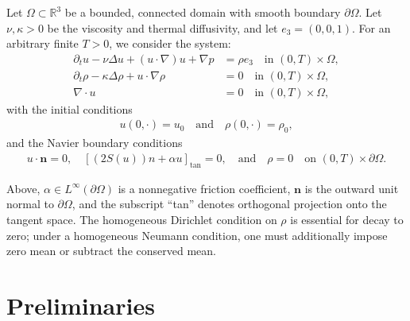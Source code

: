 \documentclass[11pt,reqno]{amsart}
\theoremstyle{plain}
\numberwithin{equation}{section}
\newcommand{\R}{\mathbb{R}}
\newcommand{\nn}{{n}}
\newcommand{\tanproj}{\text{tan}}
\newcommand{\navierbc}{\left[(2S({u}))\nn + \alpha {u}\right]_{\tanproj} = 0}
\begin{document}
Let $\Omega \subset \R^3$ be a bounded, connected domain with smooth boundary $\partial\Omega$. Let $\nu, \kappa > 0$ be the viscosity and thermal diffusivity, and let $e_3=(0,0,1)$. For an arbitrary finite $T>0$, we consider the system:
\begin{align}
    \partial_t {u} - \nu \Delta {u} + ({u} \cdot \nabla) {u} + \nabla p &= \rho {e}_3 \quad \text{in } (0, T) \times \Omega, \label{eq:bouss_momentum} \\
    \partial_t \rho - \kappa \Delta \rho + {u} \cdot \nabla \rho &= 0 \quad \text{in } (0, T) \times \Omega, \label{eq:bouss_density} \\
    \nabla \cdot {u} &= 0 \quad \text{in } (0, T) \times \Omega, \label{eq:bouss_div}
\end{align}
with the initial conditions
\begin{align*}
    {u}(0, \cdot) = {u}_0 \quad \text{and} \quad \rho(0, \cdot) = \rho_0,
\end{align*}
and the Navier boundary conditions
\begin{align}
    {u} \cdot \mathbf n = 0, \quad \navierbc, \quad \text{and} \quad \rho = 0 \quad \text{on } (0, T) \times \partial\Omega. \label{eq:navier_bc}
\end{align}


Above, $\alpha\in L^\infty(\partial\Omega)$ is a nonnegative friction coefficient, $\mathbf n$ is the outward unit normal to $\partial\Omega$, and the subscript ``tan'' denotes orthogonal projection onto the tangent space. The homogeneous Dirichlet condition on $\rho$ is essential for decay to zero; under a homogeneous Neumann condition, one must additionally impose zero mean or subtract the conserved mean.

\section{Preliminaries}\label{sec2}
\end{document}
